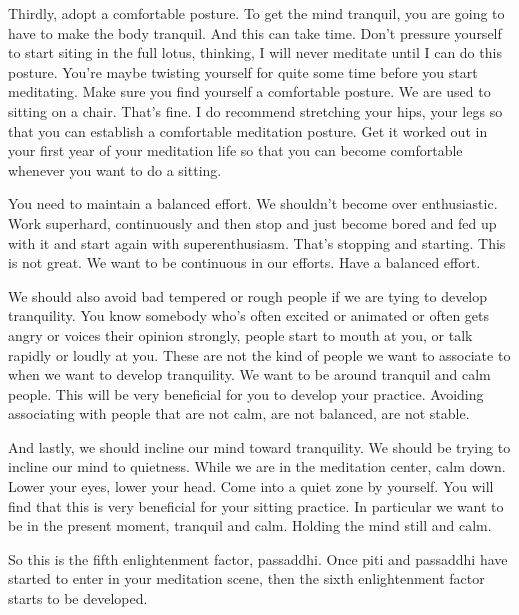 \documentclass[letterpaper,10pt,english]{sphinxmanual}
\begin{document}
\sphinxAtStartPar
Thirdly, adopt a comfortable posture. To get the mind tranquil, you are
going to have to make the body tranquil. And this can take time. Don’t pressure yourself to start siting in the full lotus, thinking, I will never meditate
until I can do this posture. You’re maybe twisting yourself for quite some
time  before  you  start  meditating.  Make  sure  you  find  yourself  a  comfortable posture. We are used to sitting on a chair. That’s fine. I do recommend
stretching your hips, your legs so that you can establish a comfortable meditation posture. Get it worked out in your first year of your meditation life so
that you can become comfortable whenever you want to do a sitting.

\sphinxAtStartPar
You  need  to  maintain  a  balanced  effort.  We  shouldn’t  become  over
enthusiastic. Work super\sphinxhyphen{}hard, continuously and then stop and just become
bored and fed up with it and start again with super\sphinxhyphen{}enthusiasm. That’s stopping and starting. This is not great. We want to be continuous in our efforts.
Have a balanced effort.

\sphinxAtStartPar
We should also avoid bad tempered or rough people if we are tying to
develop tranquility. You know somebody who’s often excited or animated
or often gets angry or voices their opinion strongly, people start to mouth
at  you,  or  talk  rapidly  or  loudly  at  you.  These  are  not  the  kind  of  people
we  want  to  associate  to  when  we  want  to  develop  tranquility. We  want to
  be around tranquil and calm people. This will be very beneficial for you to
develop your practice. Avoiding associating with people that are not calm,
are not balanced, are not stable.

\sphinxAtStartPar
And lastly, we should incline our mind toward tranquility. We should
be trying to incline our mind to quietness. While we are in the meditation
center,  calm  down.  Lower  your  eyes,  lower  your  head.  Come  into  a  quiet
zone by yourself. You will find that this is very beneficial for your sitting
practice.  In  particular  we  want  to  be  in  the  present  moment,  tranquil  and
calm. Holding the mind still and calm.

\sphinxAtStartPar
So this is the fifth enlightenment factor, passaddhi. Once piti and passaddhi have started to enter in your meditation scene, then the sixth enlightenment factor starts to be developed.
\end{document}
